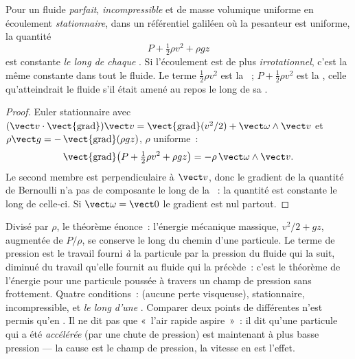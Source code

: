 \begin{theorem}[Bernoulli]\label{thm:b2:euler-bernoulli:bernoulli}
Pour un fluide \emph{parfait}, \emph{incompressible} et de masse volumique uniforme en
écoulement \emph{stationnaire}, dans un référentiel galiléen où la pesanteur est uniforme, la quantité
\[
P + \tfrac12\rho v^2 + \rho gz
\]
est constante \emph{le long de chaque }. Si l'écoulement est de plus
\emph{irrotationnel}, c'est la même constante dans tout le fluide. Le
terme $\tfrac12\rho v^2$ est la \emph{}~; $P + \tfrac12\rho v^2$
est la \emph{}, celle qu'atteindrait le fluide
s'il était amené au repos le long de sa .
\end{theorem}

\begin{proof}
Euler stationnaire avec $(\vect v\cdot\operatorname{\vect{grad}})\vect v =
\operatorname{\vect{grad}}(v^2/2) + \vect\omega\wedge\vect v$ et $\rho\vect g =
-\operatorname{\vect{grad}}(\rho gz)$, $\rho$ uniforme~:
\[
\operatorname{\vect{grad}}\bigl(P + \tfrac12\rho v^2 + \rho gz\bigr) = -\rho\,
\vect\omega\wedge\vect v .
\]
Le second membre est perpendiculaire à $\vect v$, donc le gradient de la
quantité de Bernoulli n'a pas de composante le long de la ~: la quantité
est constante le long de celle-ci. Si $\vect\omega = \vect 0$ le gradient est nul
partout.
\end{proof}

\begin{remark}\label{rem:b2:euler-bernoulli:meaning}
Divisé par $\rho$, le théorème énonce~: l'énergie mécanique massique,
$v^2/2 + gz$, augmentée de $P/\rho$, se conserve le long du chemin d'une particule.
Le terme de pression est le travail fourni \emph{à} la particule par la
pression du fluide qui la suit, diminué du travail qu'elle fournit au fluide
qui la précède~: c'est le théorème de l'énergie pour une particule poussée à travers un champ
de pression sans frottement. Quatre conditions~:  (aucune perte
visqueuse), stationnaire, incompressible, et \emph{le long d'une }. Comparer
deux points de  différentes n'est permis qu'en .
Il ne dit pas que «~l'air rapide aspire~»~: il dit qu'une particule qui
a été \emph{accélérée} (par une chute de pression) est maintenant à plus basse
pression --- la cause est le champ de pression, la vitesse en est l'effet.
\end{remark}

